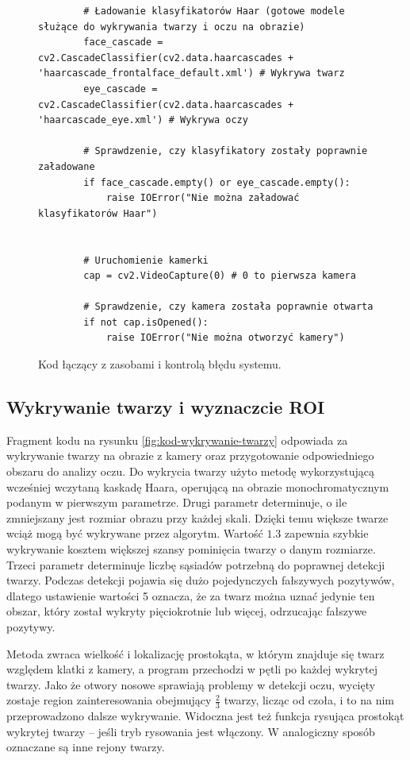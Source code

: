 \documentclass[a4paper,twoside,12pt]{book}
\begin{document}
\begin{figure}[htbp]
	\centering
	\begin{lstlisting}
		# Ładowanie klasyfikatorów Haar (gotowe modele służące do wykrywania twarzy i oczu na obrazie)
		face_cascade = cv2.CascadeClassifier(cv2.data.haarcascades + 'haarcascade_frontalface_default.xml') # Wykrywa twarz
		eye_cascade = cv2.CascadeClassifier(cv2.data.haarcascades + 'haarcascade_eye.xml') # Wykrywa oczy
		
		# Sprawdzenie, czy klasyfikatory zostały poprawnie załadowane
		if face_cascade.empty() or eye_cascade.empty():
			raise IOError("Nie można załadować klasyfikatorów Haar")
		
		
		# Uruchomienie kamerki
		cap = cv2.VideoCapture(0) # 0 to pierwsza kamera
		
		# Sprawdzenie, czy kamera została poprawnie otwarta
		if not cap.isOpened():
			raise IOError("Nie można otworzyć kamery")
	\end{lstlisting}
\caption{Kod łączący z zasobami i kontrolą błędu systemu.}
\label{fig:kod-kontrola-bledow}
\end{figure}

\subsection{Wykrywanie twarzy i wyznaczcie ROI}
\label{subsec:Wykrywanie-twarzy-i-wyznaczcie-ROI}

Fragment kodu na rysunku \ref{fig:kod-wykrywanie-twarzy} odpowiada za wykrywanie twarzy na obrazie z kamery oraz przygotowanie odpowiedniego obszaru do analizy oczu. Do wykrycia twarzy użyto metodę wykorzystującą wcześniej wczytaną kaskadę Haara, operującą na obrazie monochromatycznym podanym w pierwszym parametrze. Drugi parametr determinuje, o ile zmniejszany jest rozmiar obrazu przy każdej skali. Dzięki temu większe twarze wciąż mogą być wykrywane przez algorytm. Wartość $1.3$ zapewnia szybkie wykrywanie kosztem większej szansy pominięcia twarzy o danym rozmiarze. Trzeci parametr determinuje liczbę sąsiadów potrzebną do poprawnej detekcji twarzy. Podczas detekcji pojawia się dużo pojedynczych fałszywych pozytywów, dlatego ustawienie wartości 5 oznacza, że za twarz można uznać jedynie ten obszar, który został wykryty pięciokrotnie lub więcej, odrzucając fałszywe pozytywy.

Metoda zwraca wielkość i lokalizację prostokąta, w którym znajduje się twarz względem klatki z kamery, a program przechodzi w pętli po każdej wykrytej twarzy. Jako że otwory nosowe sprawiają problemy w detekcji oczu, wycięty zostaje region zainteresowania obejmujący $\frac{2}{3}$ twarzy, licząc od czoła, i to na nim przeprowadzono dalsze wykrywanie. Widoczna jest też funkcja rysująca prostokąt wykrytej twarzy -- jeśli tryb rysowania jest włączony. W analogiczny sposób oznaczane są inne rejony twarzy.
\end{document}
